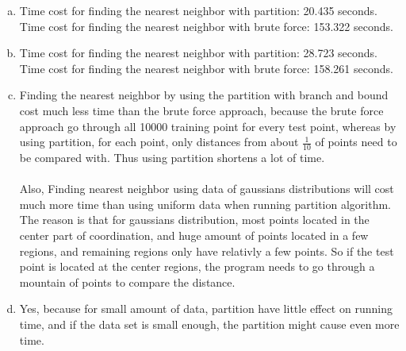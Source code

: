 \documentclass[11pt]{article}
\begin{document}
\begin{enumerate} [(a)]
	\item Time cost for finding the nearest neighbor with partition: 20.435 seconds.\\
		Time cost for finding the nearest neighbor with brute force: 153.322 seconds.
	\item Time cost for finding the nearest neighbor with partition: 28.723 seconds.\\
		Time cost for finding the nearest neighbor with brute force: 158.261 seconds.
	\item Finding the nearest neighbor by using the partition with branch and bound cost much less time than the brute force approach, because the brute force approach go through all 10000 training point for every test point, whereas by using partition, for each point, only distances from about $\frac{1}{10}$ of points need to be compared with. Thus using partition shortens a lot of time.\\
	\\
	Also, Finding nearest neighbor using data of gaussians distributions will cost much more time than using uniform data when running partition algorithm. The reason is that for gaussians distribution, most points located in the center part of coordination, and huge amount of points located in a few regions, and remaining regions only have relativly a few points. So if the test point is located at the center regions, the program needs to go through a mountain of points to compare the distance. 

	\item Yes, because for small amount of data, partition have little effect on running time, and if the data set is small enough, the partition might cause even more time.
	
\end{enumerate}
\end{document}
